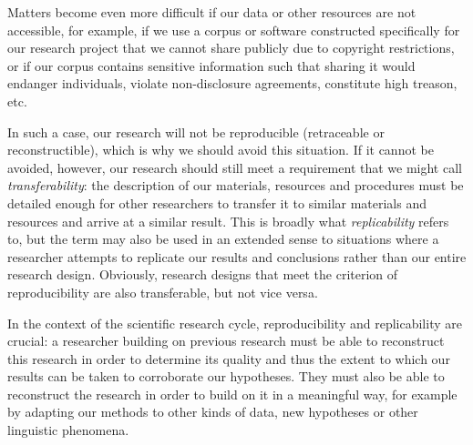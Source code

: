 Matters become even more difficult if our data or other resources are not accessible, for example, if we use a corpus or software constructed specifically for our research project that we cannot share publicly due to copyright restrictions, or if our corpus contains sensitive information such that sharing it would endanger individuals, violate non\hyp{}disclosure agreements, constitute high treason, etc.

In such a case, our research will not be reproducible  (retraceable  or reconstructible),  which is why we should avoid this situation. If it cannot be avoided, however, our research should still meet a requirement that we might call \textit{transferability}: the description of our materials, resources and procedures must be detailed enough for other researchers to transfer it to similar materials and resources and arrive at a similar result. This is broadly what \textit{replicability}  refers to, but the term may also be used in an extended sense to situations where a researcher attempts to replicate our results and conclusions rather than our entire research design.  Obviously, research designs that meet the criterion of reproducibility  are also transferable, but not vice versa.

In the context of the scientific research cycle, reproducibility  and replicability  are crucial: a researcher building on previous research must be able to reconstruct this research in order to determine its quality and thus the extent to which our results can be taken to corroborate our hypotheses. They must also be able to reconstruct the research in order to build on it in a meaningful way, for example by adapting our methods to other kinds of data, new hypotheses or other linguistic phenomena.

